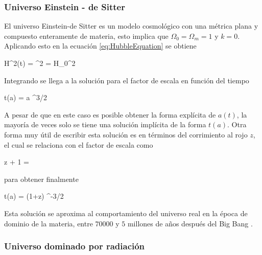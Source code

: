 			\subsubsection*{Universo Einstein - de Sitter}


El universo Einstein-de Sitter es un modelo cosmológico con una métrica 
plana y compuesto enteramente de materia, esto implica que 
$\Omega_0 = \Omega_m = 1$ y $k=0$. Aplicando esto en la ecuación 
\ref{eq:HubbleEquation} se obtiene


{ H^2(t) = ^2 = H_0^2  }


Integrando se llega a la solución para el factor de escala en función del 
tiempo


{ t(a) =  a ^{3/2} }


A pesar de que en este caso es posible obtener la forma explícita de $a(t)$,
la mayoría de veces solo se tiene una solución implícita de la forma $t(a)$.
Otra forma muy útil de escribir esta solución es en términos del corrimiento
al rojo $z$, el cual se relaciona con el factor de escala como 
\cite{longair2008}


{ z + 1 =  }


para obtener finalmente


{ t(a) =  (1+z) ^{-3/2} }


Esta solución se aproxima al comportamiento del universo real en la época
de dominio de la materia, entre $70000$ y $5$ millones de años después del 
Big Bang \cite{padmanabhan1995}.


			\subsubsection*{Universo dominado por radiación}

